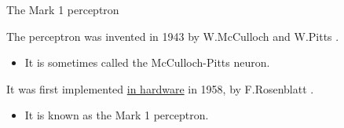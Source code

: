 \begin{frame}[t]{The Mark 1 perceptron}

    The perceptron was invented in 1943 
    by W.McCulloch and W.Pitts \cite{McCulloch:1943p}.
    \begin{itemize}
      \item It is sometimes called the \gls{McCulloch-Pitts neuron}.
    \end{itemize}

    It was first implemented \underline{in hardware} in 1958, 
    by F.\gls{Rosenblatt} \cite{Rosenblatt:1958p}.
    \begin{itemize}
        \item It is known as the \gls{Mark 1 perceptron}.
      \end{itemize}
  

\end{frame}
